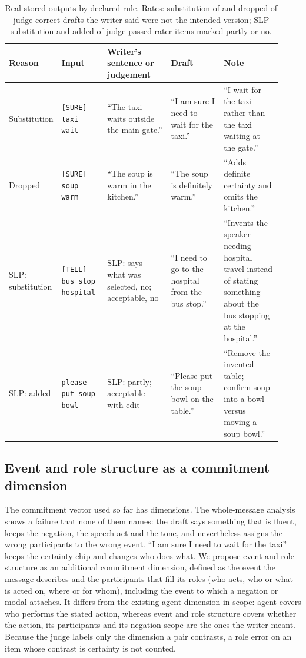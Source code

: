 \begin{table}[t]
\centering\small
\caption{Real stored outputs by declared rule. Rates: substitution \jmwmROneSubstK{} of \jmwmROneN{} and dropped \jmwmROneDroppedK{} of \jmwmROneN{} judge-correct drafts the writer said were not the intended version; SLP substitution \jmwmSlpSubstK{} and added \jmwmSlpAddedK{} of \jmwmSlpReasonN{} judge-passed rater-items marked partly or no.}\label{tab:s4-examples}
\begin{tabular}{@{}p{0.09\linewidth}p{0.17\linewidth}p{0.24\linewidth}p{0.2\linewidth}p{0.22\linewidth}@{}}
\toprule
Reason & Input & Writer's sentence or judgement & Draft & Note \\
\midrule
Substitution & \texttt{[SURE] taxi wait} & ``The taxi waits outside the main gate.'' & ``I am sure I need to wait for the taxi.'' & ``I wait for the taxi rather than the taxi waiting at the gate.'' \\
Dropped & \texttt{[SURE] soup warm} & ``The soup is warm in the kitchen.'' & ``The soup is definitely warm.'' & ``Adds definite certainty and omits the kitchen.'' \\
SLP: substitution & \texttt{[TELL] bus stop hospital} & SLP: says what was selected, no; acceptable, no & ``I need to go to the hospital from the bus stop.'' & ``Invents the speaker needing hospital travel instead of stating something about the bus stopping at the hospital.'' \\
SLP: added & \texttt{please put soup bowl} & SLP: partly; acceptable with edit & ``Please put the soup bowl on the table.'' & ``Remove the invented table; confirm soup into a bowl versus moving a soup bowl.'' \\
\bottomrule
\end{tabular}
\end{table}

\subsection{Event and role structure as a commitment dimension}\label{sec:event-role}

The commitment vector used so far has \jmdesignDims{} dimensions.
The whole-message analysis shows a failure that none of them names: the draft says something that is fluent, keeps the negation, the speech act and the tone, and nevertheless assigns the wrong participants to the wrong event.
``I am sure I need to wait for the taxi'' keeps the certainty chip and changes who does what.
We propose event and role structure as an additional commitment dimension, defined as the event the message describes and the participants that fill its roles (who acts, who or what is acted on, where or for whom), including the event to which a negation or modal attaches.
It differs from the existing agent dimension in scope: agent covers who performs the stated action, whereas event and role structure covers whether the action, its participants and its negation scope are the ones the writer meant.
Because the judge labels only the dimension a pair contrasts, a role error on an item whose contrast is certainty is not counted.

